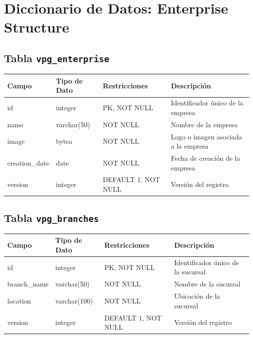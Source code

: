\section{Diccionario de Datos: Enterprise Structure}
\begin{center}
	\subsection{Tabla \texttt{vpg\_enterprise}}
	\small
	\begin{tabular}{|l|l|l|p{6cm}|}
		\hline
		\textbf{Campo} & \textbf{Tipo de Dato} & \textbf{Restricciones} & \textbf{Descripción}                \\
		\hline
		id             & integer               & PK, NOT NULL           & Identificador único de la empresa   \\
		name           & varchar(50)           & NOT NULL               & Nombre de la empresa                \\
		image          & bytea                 & NOT NULL               & Logo o imagen asociada a la empresa \\
		creation\_date & date                  & NOT NULL               & Fecha de creación de la empresa     \\
		version        & integer               & DEFAULT 1, NOT NULL    & Versión del registro                \\
		\hline
	\end{tabular}

	\subsection{Tabla \texttt{vpg\_branches}}
	\begin{tabular}{|l|l|l|l|}
		\hline
		\textbf{Campo} & \textbf{Tipo de Dato} & \textbf{Restricciones} & \textbf{Descripción}               \\
		\hline
		id             & integer               & PK, NOT NULL           & Identificador único de la sucursal \\
		branch\_name   & varchar(50)           & NOT NULL               & Nombre de la sucursal              \\
		location       & varchar(100)          & NOT NULL               & Ubicación de la sucursal           \\
		version        & integer               & DEFAULT 1, NOT NULL    & Versión del registro               \\
		\hline
	\end{tabular}


\end{center}
